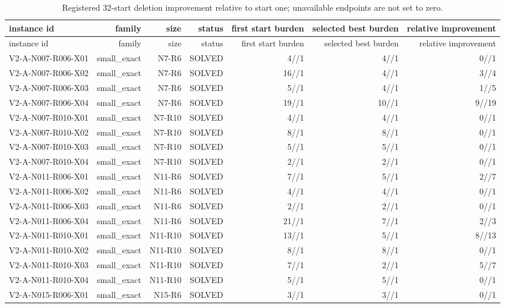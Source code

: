 {\footnotesize
\begin{longtable}{lrrrrrr}
\caption{Registered 32-start deletion improvement relative to start one; unavailable endpoints are not set to zero.}\label{tab:aor-multistart-improvement}\\
\toprule
instance id & family & size & status & first start burden & selected best burden & relative improvement \\
\midrule
\endfirsthead
\toprule
instance id & family & size & status & first start burden & selected best burden & relative improvement \\
\midrule
\endhead
V2-A-N007-R006-X01 & small\_exact & N7-R6 & SOLVED & 4//1 & 4//1 & 0//1 \\
V2-A-N007-R006-X02 & small\_exact & N7-R6 & SOLVED & 16//1 & 4//1 & 3//4 \\
V2-A-N007-R006-X03 & small\_exact & N7-R6 & SOLVED & 5//1 & 4//1 & 1//5 \\
V2-A-N007-R006-X04 & small\_exact & N7-R6 & SOLVED & 19//1 & 10//1 & 9//19 \\
V2-A-N007-R010-X01 & small\_exact & N7-R10 & SOLVED & 4//1 & 4//1 & 0//1 \\
V2-A-N007-R010-X02 & small\_exact & N7-R10 & SOLVED & 8//1 & 8//1 & 0//1 \\
V2-A-N007-R010-X03 & small\_exact & N7-R10 & SOLVED & 5//1 & 5//1 & 0//1 \\
V2-A-N007-R010-X04 & small\_exact & N7-R10 & SOLVED & 2//1 & 2//1 & 0//1 \\
V2-A-N011-R006-X01 & small\_exact & N11-R6 & SOLVED & 7//1 & 5//1 & 2//7 \\
V2-A-N011-R006-X02 & small\_exact & N11-R6 & SOLVED & 4//1 & 4//1 & 0//1 \\
V2-A-N011-R006-X03 & small\_exact & N11-R6 & SOLVED & 2//1 & 2//1 & 0//1 \\
V2-A-N011-R006-X04 & small\_exact & N11-R6 & SOLVED & 21//1 & 7//1 & 2//3 \\
V2-A-N011-R010-X01 & small\_exact & N11-R10 & SOLVED & 13//1 & 5//1 & 8//13 \\
V2-A-N011-R010-X02 & small\_exact & N11-R10 & SOLVED & 8//1 & 8//1 & 0//1 \\
V2-A-N011-R010-X03 & small\_exact & N11-R10 & SOLVED & 7//1 & 2//1 & 5//7 \\
V2-A-N011-R010-X04 & small\_exact & N11-R10 & SOLVED & 5//1 & 5//1 & 0//1 \\
V2-A-N015-R006-X01 & small\_exact & N15-R6 & SOLVED & 3//1 & 3//1 & 0//1 \\

\end{longtable}}
